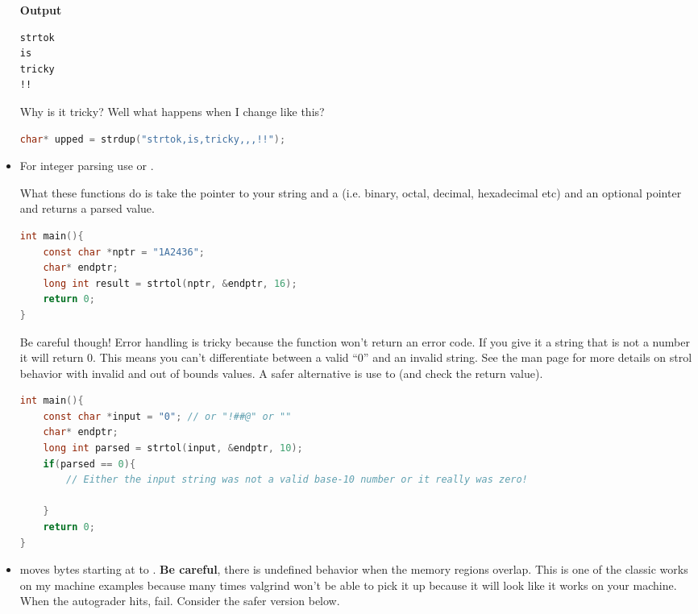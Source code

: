 \begin{itemize}
	      \textbf{Output}

	      \begin{lstlisting}[language=console]
strtok
is
tricky
!!
\end{lstlisting}

	      Why is it tricky? Well what happens when I change  like this?

	      \begin{lstlisting}[language=C]
char* upped = strdup("strtok,is,tricky,,,!!");
\end{lstlisting}

	\item For integer parsing use
	      or
	      .

	      What these functions do is take the pointer to your string
	       and a  (i.e. binary, octal, decimal,
	      hexadecimal etc) and an optional pointer  and returns a
	      parsed value.

	      \begin{lstlisting}[language=C]
int main(){
    const char *nptr = "1A2436";
    char* endptr;
    long int result = strtol(nptr, &endptr, 16);
    return 0;
}
\end{lstlisting}

	      Be careful though! Error handling is tricky because the function won't return an error code.
        If you give it a string that is not a number it will return 0.
        This means you can't differentiate between a valid ``0'' and an invalid string.
        See the man page for more details on strol behavior with invalid and out of bounds values.
        A safer alternative is use to  (and check the return value).

	      \begin{lstlisting}[language=C]
int main(){
    const char *input = "0"; // or "!##@" or ""
    char* endptr;
    long int parsed = strtol(input, &endptr, 10);
    if(parsed == 0){
        // Either the input string was not a valid base-10 number or it really was zero!

    }
    return 0;
}
\end{lstlisting}

	    \item {} moves  bytes starting at  to .
        \textbf{Be careful}, there is undefined behavior when the memory regions overlap.
        This is one of the classic works on my machine examples because many times valgrind won't be able to pick it up because it will look like it works on your machine.
        When the autograder hits, fail.
        Consider the safer version below.


\end{itemize}
